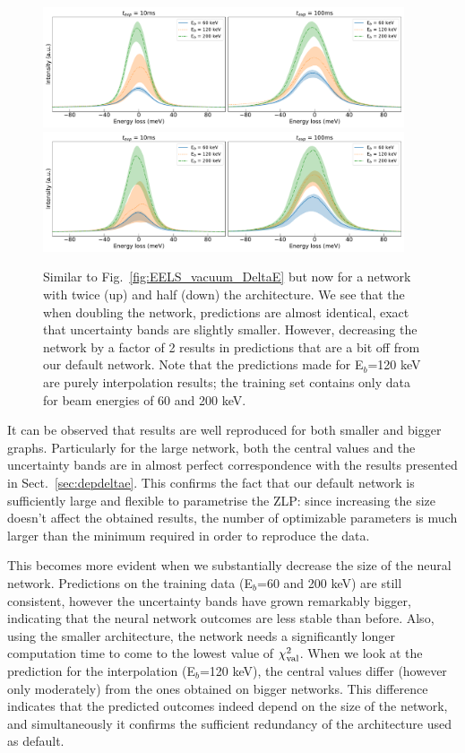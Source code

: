 \begin{figure}[H]
\centering
 \includegraphics[width=0.95\textwidth]{plots/Prediction_120keV_bignetwork.pdf}
 \includegraphics[width=0.95\textwidth]{plots/Prediction_120keV_smallnetwork.pdf}
 \caption{Similar to Fig.~\ref{fig:EELS_vacuum_DeltaE} but now
    for a network with twice (up) and half (down) the architecture. 
    We see that the when doubling the network, predictions are
    almost identical, exact that uncertainty bands are slightly smaller.
    However, decreasing the network by a factor of 2 results in predictions
    that are a bit off from our default network. 
    Note that the predictions made for E$_b$=120 keV are purely
    interpolation results; the training set contains only data for beam 
    energies of 60 and 200 keV.
    }
    \label{fig:EELS_vacuum_DeltaE_check}
\end{figure}
It can be observed that results are well
reproduced for both smaller and bigger graphs. 
%
Particularly for the large network, both the central values and the uncertainty bands are 
in almost perfect correspondence with the results presented in Sect.~\ref{sec:depdeltae}. 
%
This confirms the fact that our default network is sufficiently large and flexible to parametrise
the ZLP: since increasing the size doesn't affect the obtained results, 
the number of optimizable parameters is much larger than the 
minimum required in order to reproduce the data.

This becomes more evident when we substantially decrease the size of the neural network.
Predictions on the training data (E$_b$=60 and 200 keV) are still consistent, however the uncertainty
bands have grown remarkably bigger, indicating that the neural network outcomes are less 
stable than before. 
%
Also, using the smaller architecture,  the network needs a significantly longer computation time 
to come to the lowest value of $\chi^2_{\rm val}$.
%
When we look at the prediction for the interpolation (E$_b$=120 keV), the central 
values differ (however only moderately) from the ones obtained on bigger networks.
%
This difference indicates that the predicted outcomes indeed depend on the size of the network,
and simultaneously it confirms the sufficient redundancy of the architecture used as default. \\

